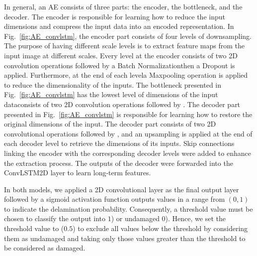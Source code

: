 In general, an AE consists of three parts: the encoder, the bottleneck, and the decoder.
The encoder is responsible for learning how to reduce the input dimensions and compress the input data into an encoded representation.
In Fig.~\ref{fig:AE_convlstm}, the encoder part consists of four levels of downsampling. 
The purpose of having different scale levels is to extract feature maps from the input image at different scales.
Every level at the encoder consists of two 2D convolution operations followed by a Batch Normalization\DIFaddbegin {}\DIFaddend then a Dropout is applied.
Furthermore, at the end of each level\DIFaddbegin \DIFadd{, }\DIFaddend a Maxpooling operation is applied to reduce the dimensionality of the inputs. 
The bottleneck presented in Fig.~\ref{fig:AE_convlstm} has the lowest level of dimensions of the input data\DIFdelbegin {}\DIFdelend \DIFaddbegin {}\DIFaddend consists of two 2D convolution operations followed by \DIFdelbegin {}\DIFdelend \DIFaddbegin {}\DIFaddend .
The decoder part presented in Fig.~\ref{fig:AE_convlstm} \DIFdelbegin \DIFdel{, }\DIFdelend is responsible for learning how to restore the original dimensions of the input.
The decoder part consists of two 2D convolutional operations followed by \DIFdelbegin {}\DIFdelend \DIFaddbegin {}\DIFaddend , and an upsampling \DIFdelbegin {}\DIFdelend is applied at the end of each decoder level to retrieve the dimensions of its inputs.
Skip connections linking the encoder with the corresponding decoder levels were added to enhance the \DIFdelbegin {}\DIFdelend \DIFaddbegin {}\DIFaddend extraction process.
The outputs of the decoder were forwarded into the ConvLSTM2D layer to learn long-term \DIFdelbegin {}\DIFdelend \DIFaddbegin {}\DIFaddend features.

In both models, we applied a 2D convolutional layer as the final output layer followed by a sigmoid activation function \DIFdelbegin {}\DIFdelend \DIFaddbegin {}\DIFaddend outputs values in a range from \((0,1)\) to indicate the delamination probability.
Consequently, a threshold value must be chosen to classify the output into \DIFdelbegin {}\DIFdelend \DIFaddbegin {}\DIFaddend \(1\)) or undamaged \DIFdelbegin {}\DIFdelend \DIFaddbegin {}\DIFaddend \(0\)).
Hence, we set the threshold value to (\(0.5\)) to exclude all values below the threshold by considering them as undamaged and taking only those values greater than the threshold to be considered as damaged.

